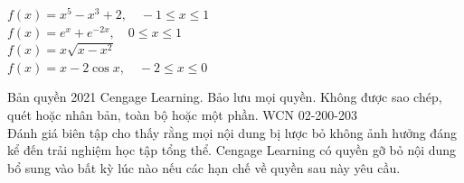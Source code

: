 \begin{minipage}[t]{0.485\textwidth}
\vspace{4pt}
$f(x) = x^5 - x^3 + 2, \quad -1 \le x \le 1$\\[3pt]
$f(x) = e^x + e^{-2x}, \quad 0 \le x \le 1$\\[3pt]
$f(x) = x\sqrt{x - x^2}$\\[3pt]
$f(x) = x - 2\cos x, \quad -2 \le x \le 0$
\end{minipage}

\vfill
\begin{center}
\fontsize{6.5pt}{8.2pt}\selectfont\color{black!75}
Bản quyền 2021 Cengage Learning. Bảo lưu mọi quyền. Không được sao chép, quét hoặc nhân bản, toàn bộ hoặc một phần. WCN 02-200-203\\
Đánh giá biên tập cho thấy rằng mọi nội dung bị lược bỏ không ảnh hưởng đáng kể đến trải nghiệm học tập tổng thể. Cengage Learning có quyền gỡ bỏ nội dung bổ sung vào bất kỳ lúc nào nếu các hạn chế về quyền sau này yêu cầu.
\end{center}
